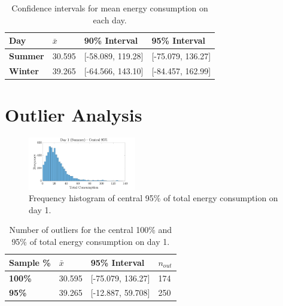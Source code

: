 \documentclass[a4paper,10pt,twocolumn]{article}
\begin{document}
\begin{table}
    \centering
    \begin{tabular}{llll}
        \toprule
        \textbf{Day} & $\bar{x}$ & 90\% Interval     & 95\% Interval \\
        \midrule
        \textbf{Summer} & 30.595 & [-58.089, 119.28] & [-75.079, 136.27] \\
        \textbf{Winter} & 39.265 & [-64.566, 143.10] & [-84.457, 162.99] \\
        \bottomrule
    \end{tabular}
    \caption{Confidence intervals for mean energy consumption on each day.}
    \label{table:Mean}
\end{table}

\section{Outlier Analysis}


\begin{figure}[h]
    \centering
    \includegraphics[width=0.42\textwidth]{Day1Central95}
    \caption{Frequency histogram of central 95\% of total energy consumption on 
    day 1.}
    \label{fig:NoOutliers}
\end{figure}

\begin{table}
    \centering
    \begin{tabular}{llll}
        \toprule
        \textbf{Sample \%} & $\bar{x}$ & 95\% Interval & 
        $n_{out}$ \\
        \midrule
        \textbf{100\%} & 30.595 & [-75.079, 136.27] & 174 \\
        \textbf{95\%}  & 39.265 & [-12.887, 59.708] & 250 \\
        \bottomrule
    \end{tabular}
    \caption{Number of outliers for the central 100\% and 95\% of total energy 
    consumption on day 1.}
    \label{table:Outliers}
\end{table}

\printbibliography

\clearpage
\end{document}
